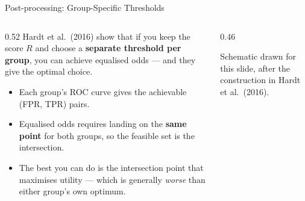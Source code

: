 
\begin{frame}{Post-processing: Group-Specific Thresholds}

    \begin{columns}[T]
        \begin{column}{0.52\textwidth}
            Hardt et al.\ (2016) show that if you keep the score $R$ and choose a
            \textbf{separate threshold per group}, you can achieve equalised odds --- and they give
            the optimal choice.

            \vspace{0.6em}
            \begin{itemize}\scriptsize
                \setlength\itemsep{0.3em}
                \item Each group's ROC curve gives the achievable (FPR, TPR) pairs.
                \item Equalised odds requires landing on the \textbf{same point} for both groups,
                      so the feasible set is the intersection.
                \item The best you can do is the intersection point that maximises utility ---
                      which is generally \emph{worse} than either group's own optimum.
            \end{itemize}
        \end{column}
        \begin{column}{0.46\textwidth}
            \centering

            \vspace{0.2em}
            {\scriptsize Schematic drawn for this slide, after the construction in Hardt et al.\ (2016).\par}
        \end{column}
    \end{columns}


\end{frame}
